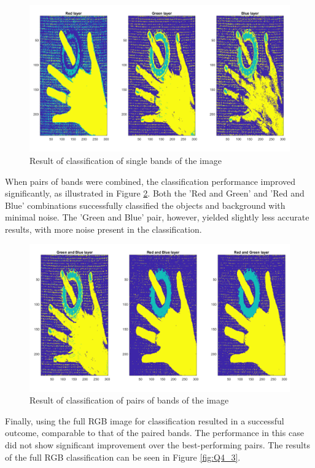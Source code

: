\documentclass[12pt]{article}
\begin{document}
\begin{figure}[htbp!]
  \centering
  \includegraphics[width =\textwidth]{images/Q4_1b.png}
  \caption{Result of classification of single bands of the image}
  \label{fig:Q4_1}
\end{figure}
When pairs of bands were combined, the classification performance improved significantly, as illustrated in Figure \ref{fig:Q4_2}. Both the 'Red and Green' and 'Red and Blue' combinations successfully classified the objects and background with minimal noise. The 'Green and Blue' pair, however, yielded slightly less accurate results, with more noise present in the classification.
\begin{figure}[htbp!]
  \centering
  \includegraphics[width =\textwidth]{images/Q4_2b.png}
  \caption{Result of classification of pairs of bands of the image}
  \label{fig:Q4_2}
\end{figure}
Finally, using the full RGB image for classification resulted in a successful outcome, comparable to that of the paired bands. The performance in this case did not show significant improvement over the best-performing pairs. The results of the full RGB classification can be seen in Figure \ref{fig:Q4_3}.
\end{document}
